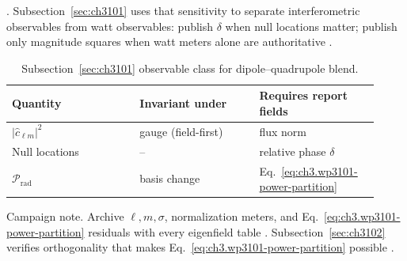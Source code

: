 \cite{jackson1999}. Subsection~\ref{sec:ch3101} uses that sensitivity to separate interferometric observables from watt observables: publish \(\delta\) when null locations matter; publish only magnitude squares when watt meters alone are authoritative
\cite{hansen1988}.
\begin{table}[t]
\centering
\caption{Subsection~\ref{sec:ch3101} observable class for dipole--quadrupole blend.}
\label{tab:ch3.3101-observable-class}
\small
\begin{tabular}{@{}p{0.32\linewidth}p{0.30\linewidth}p{0.30\linewidth}@{}}
\toprule
Quantity & Invariant under & Requires report fields \\
\midrule
$|\widehat{c}_{\ell m}|^{2}$ & gauge (field-first) & flux norm \\
Null locations & -- & relative phase $\delta$ \\
$\mathcal{P}_{\mathrm{rad}}$ & basis change & Eq.~\eqref{eq:ch3.wp3101-power-partition} \\
\bottomrule
\end{tabular}
\end{table}
Campaign note. Archive \(\ell,m,\sigma\), normalization meters, and Eq.~\eqref{eq:ch3.wp3101-power-partition} residuals with every eigenfield table
\cite{harrington2001}. Subsection~\ref{sec:ch3102} verifies orthogonality that makes
Eq.~\eqref{eq:ch3.wp3101-power-partition} possible \cite{stratton1941}.
